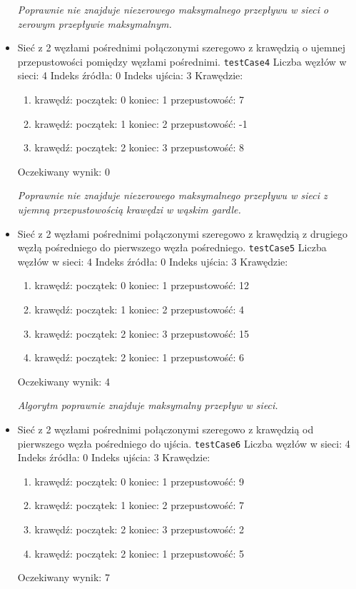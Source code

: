 \begin{itemize}[nosep]
    \emph{Poprawnie nie znajduje niezerowego maksymalnego przepływu w sieci o zerowym przepływie maksymalnym.}

    \item Sieć z 2 węzłami pośrednimi połączonymi szeregowo z krawędzią o
    ujemnej przepustowości pomiędzy węzłami pośrednimi.
    \texttt{testCase4}
    Liczba węzłów w sieci: 4
    Indeks źródła: 0
    Indeks ujścia: 3
    Krawędzie:
    \begin{enumerate}[nosep]
        \item krawędź:
        początek: 0
        koniec: 1
        przepustowość: 7
        \item krawędź:
        początek: 1
        koniec: 2
        przepustowość: -1
        \item krawędź:
        początek: 2
        koniec: 3
        przepustowość: 8
    \end{enumerate}
    Oczekiwany wynik: 0

    \emph{Poprawnie nie znajduje niezerowego maksymalnego przepływu w sieci z ujemną przepustowością krawędzi w wąskim gardle.}

    \item Sieć z 2 węzłami pośrednimi połączonymi szeregowo z krawędzią z
    drugiego węzłą pośredniego do pierwszego węzła pośredniego.
    \texttt{testCase5}
    Liczba węzłów w sieci: 4
    Indeks źródła: 0
    Indeks ujścia: 3
    Krawędzie:
    \begin{enumerate}[nosep]
        \item krawędź:
        początek: 0
        koniec: 1
        przepustowość: 12
        \item krawędź:
        początek: 1
        koniec: 2
        przepustowość: 4
        \item krawędź:
        początek: 2
        koniec: 3
        przepustowość: 15
        \item krawędź:
        początek: 2
        koniec: 1
        przepustowość: 6
    \end{enumerate}
    Oczekiwany wynik: 4

    \emph{Algorytm poprawnie znajduje maksymalny przepływ w sieci.}

    \item Sieć z 2 węzłami pośrednimi połączonymi szeregowo z krawędzią od
    pierwszego węzła pośredniego do ujścia.
    \texttt{testCase6}
    Liczba węzłów w sieci: 4
    Indeks źródła: 0
    Indeks ujścia: 3
    Krawędzie:
    \begin{enumerate}[nosep]
        \item krawędź:
        początek: 0
        koniec: 1
        przepustowość: 9
        \item krawędź:
        początek: 1
        koniec: 2
        przepustowość: 7
        \item krawędź:
        początek: 2
        koniec: 3
        przepustowość: 2
        \item krawędź:
        początek: 2
        koniec: 1
        przepustowość: 5
    \end{enumerate}
    Oczekiwany wynik: 7


\end{itemize}
